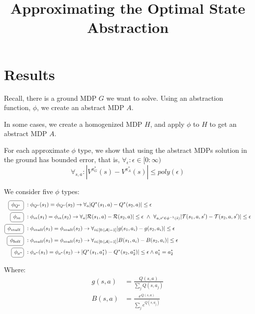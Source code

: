 \documentclass[11pt]{amsart}
\title{Approximating the Optimal State Abstraction}
\author{}
\date{}                                           %
\begin{document}
\maketitle
\section{Results}

Recall, there is a ground MDP $G$ we want to solve. Using an abstraction function, $\phi$, we create an abstract MDP $A$.

In some cases, we create a homogenized MDP $H$, and apply $\phi$ to $H$ to get an abstract MDP $A$.

For each approximate $\phi$ type, we show that using the abstract MDPs solution in the ground has bounded error, that is, $\forall_{\epsilon} : \epsilon \in [0 : \infty)$
\begin{equation}
\forall_{s,a} : | V^{\pi^*_G}(s) - V^{\pi^*_{A}}(s) | \leq poly(\epsilon)
\end{equation}

We consider five $\phi$ types:
\begin{align*}
\encircle{\text{ $\phi_{Q^*}$ }}\ & : \phi_{Q^*}(s_1) = \phi_{Q^*}(s_2) \rightarrow \forall_a |Q^*(s_1,a) - Q^*(s_2,a)| \leq \epsilon \\
\encircle{\text{ $\phi_m$ }}\ & : \phi_{m}(s_1) = \phi_m(s_2) \rightarrow \forall_a |\mathcal{R}(s_1,a) - \mathcal{R}(s_2,a)| \leq \epsilon \ \wedge\ 
\forall_{a,s' \in \phi^{-1}(\bar{s})} | \mathcal{T}(s_1,a,s') - \mathcal{T}(s_2,a,s') | \leq \epsilon \\
\encircle{\text{ $\phi_{mult}$ }}\ & : \phi_{mult}(s_1) = \phi_{mult}(s_2) \rightarrow \forall_{i \in [0:|\mathcal{A}| - 1]} | g(s_1, a_i) - g(s_2, a_i) | \leq \epsilon \\
\encircle{\text{ $\phi_{bolt}$ }}\ & : \phi_{mult}(s_1) = \phi_{mult}(s_2) \rightarrow \forall_{i \in [0:|\mathcal{A}| - 1]} | B(s_1, a_i) - B(s_2, a_i) | \leq \epsilon \\
\encircle{\text{ $\phi_{a^*}$}}\ & : \phi_{a^*}(s_1) = \phi_{a^*}(s_2) \rightarrow |Q^*(s_1,a_1^*) - Q^*(s_2,a_2^*) | \leq \epsilon \wedge a_1^* = a_2^*
\end{align*}

Where:
\begin{align}
g(s,a) &= \frac{Q(s,a)}{\sum_j Q(s,a_j)} \\
B(s,a) &= \frac{e^{Q(s,a)}}{\sum_j e^{Q(s,a_j)}}
\end{align}
\end{document}
